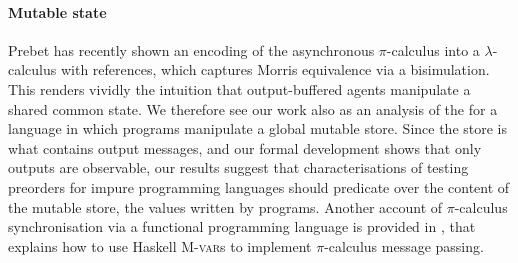  \paragraph{Mutable state}
  Prebet \cite{DBLP:conf/icalp/Prebet22} has recently shown an 
  encoding of the asynchronous $\pi$-calculus into a $\lambda$-calculus
  with references, which captures Morris equivalence via a bisimulation.
  This renders vividly the intuition that output-buffered agents
  manipulate a shared common state.
  We therefore see our work also as an analysis of the \mustpreorder for
  a language in which programs manipulate a global mutable store.
  Since the store is what contains output messages, and our formal
  development shows that only outputs are observable, our results
  suggest that characterisations of testing preorders for impure
  programming languages should predicate over the content of the mutable
  store, \ie the values written by programs.
  Another account of $\pi$-calculus synchronisation via a
    functional programming language is provided in
    \cite{DBLP:journals/corr/abs-2008-13359}, that explains how to
    use Haskell \textsc{M-var}s to implement $\pi$-calculus
    message passing.








